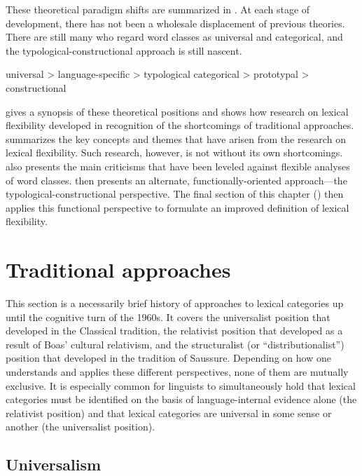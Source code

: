 These theoretical paradigm shifts are summarized in . At each stage of development, there has not been a wholesale displacement of previous theories. There are still many who regard word classes as universal and categorical, and the typological-constructional approach is still nascent.

\begin{exe}
  \ex\label{ex:2.1}
  \begin{xlist}
    \ex universal > language-specific > typological
    \ex categorical > prototypal > constructional
  \end{xlist}
\end{exe}

 gives a synopsis of these theoretical positions and shows how research on lexical flexibility developed in recognition of the shortcomings of traditional approaches.  summarizes the key concepts and themes that have arisen from the research on lexical flexibility. Such research, however, is not without its own shortcomings.  also presents the main criticisms that have been leveled against flexible analyses of word classes.  then presents an alternate, functionally-oriented approach—the typological-constructional perspective. The final section of this chapter () then applies this functional perspective to formulate an improved definition of lexical flexibility.

\section{Traditional approaches}
\label{sec:2.2}

This section is a necessarily brief history of approaches to lexical categories up until the cognitive turn of the 1960s. It covers the universalist position that developed in the Classical tradition, the relativist position that developed as a result of Boas' cultural relativism, and the structuralist (or \enquote{distributionalist}) position that developed in the tradition of Saussure. Depending on how one understands and applies these different perspectives, none of them are mutually exclusive. It is especially common for linguists to simultaneously hold that lexical categories must be identified on the basis of language-internal evidence alone (the relativist position) and that lexical categories are universal in some sense or another (the universalist position).

\subsection{Universalism}
\label{sec:2.2.1}

